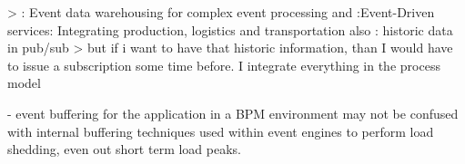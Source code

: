 > \cite{roth2010event}: Event data warehousing for complex event processing and \cite{buchmann2010event}:Event-Driven services: Integrating production, logistics and transportation
also \cite{li2007historic}: historic data in pub/sub
> but if i want to have that historic information, than I would have to issue a subscription some time before. I integrate everything in the process model

- event buffering for the application in a BPM environment may not be confused with internal buffering techniques used within event engines to perform load shedding, even out short term load peaks. 


